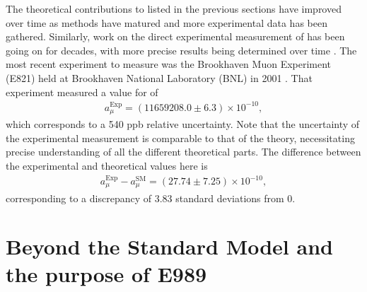 The theoretical contributions to \amu listed in the previous sections have improved over time as methods have matured and more experimental data has been gathered. Similarly, work on the direct experimental measurement of \amu has been going on for decades, with more precise results being determined over time \cite{PastExperiments}. The most recent experiment to measure \gmtwo was the Brookhaven Muon \gmtwo Experiment (E821) held at Brookhaven National Laboratory (BNL) in 2001 . That experiment measured a value for \amu of \cite{E821FinalReport}
		\begin{align}
            a_{\mu}^{\text{Exp}} = (11659208.0 \pm 6.3) \times 10^{-10},
		\end{align}
which corresponds to a 540 ppb relative uncertainty. Note that the uncertainty of the experimental measurement is comparable to that of the theory, necessitating precise understanding of all the different theoretical parts. The difference between the experimental and theoretical values here is
		\begin{align}
            a_{\mu}^{\text{Exp}} - a_{\mu}^{\text{SM}} = (27.74 \pm 7.25) \times 10^{-10},
		\end{align}
corresponding to a discrepancy of 3.83 standard deviations from 0.



\section{Beyond the Standard Model and the purpose of E989}
\label{sec:BSM}


